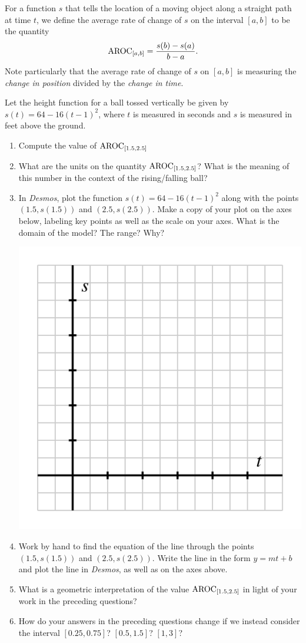 \documentclass[nooutcomes]{ximera}
\begin{document}
For a function $s$ that tells the location of a moving object along a straight path at time $t$, we define the average rate of change of $s$ on the interval $[a,b]$ to be the quantity%
\begin{equation*}
\mathrm{AROC}_{[a,b]} = \frac{s(b)-s(a)}{b-a}\text{.}
\end{equation*}
 Note particularly that the average rate of change of $s$ on $[a,b]$ is measuring the \emph{change in position} divided by the \emph{change in time}.%

\begin{exploration}
Let the height function for a ball tossed vertically be given by $s(t) = 64 - 16(t-1)^2$, where $t$ is measured in seconds and $s$ is measured in feet above the ground.
\begin{enumerate}[label=\alph*.]
\item Compute the value of $\mathrm{AROC}_{[1.5,2.5]}$
\item What are the units on the quantity $\mathrm{AROC}_{[1.5,2.5]}$? What is the meaning of this number in the context of the rising/falling ball?
\item In \emph{Desmos}, plot the function $s(t) = 64 - 16(t-1)^2$ along with the points $(1.5,s(1.5))$ and $(2.5, s(2.5))$. Make a copy of your plot on the axes below, labeling key points as well as the scale on your axes. What is the domain of the model? The range? Why?
\begin{image}
\includegraphics[width=.7\textwidth]{aroc-s-t-blank-axes.jpg}
\end{image}
\item Work by hand to find the equation of the line through the points $(1.5,s(1.5))$ and $(2.5, s(2.5))$. Write the line in the form $y = mt + b$ and plot the line in \emph{Desmos}, as well as on the axes above.
\item What is a geometric interpretation of the value $\mathrm{AROC}_{[1.5,2.5]}$ in light of your work in the preceding questions?
\item How do your answers in the preceding questions change if we instead consider the interval $[0.25, 0.75]$? $[0.5, 1.5]$? $[1,3]$?
\end{enumerate}
\end{exploration}
\end{document}
